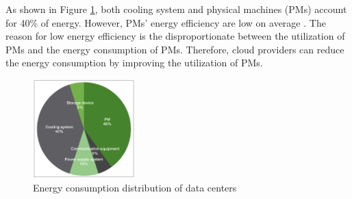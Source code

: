  As shown in Figure \ref{fig:consumption}, both cooling system and physical machines (PMs) account for 40\% of energy. However, PMs' energy efficiency are low on average  \cite{Hameed:2016cmb}.
The reason for low energy efficiency is the disproportionate between the utilization of PMs and the energy consumption of PMs.  Therefore, 
cloud providers can reduce the energy consumption by improving the utilization of PMs.



\begin{figure}
	\centering
		\includegraphics[width=0.35\textwidth]{pics/energyConsumption.png}
		\caption{Energy consumption distribution of data centers \cite{Rong:2016js}}
		\label{fig:consumption}
\end{figure} 

